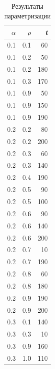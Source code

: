 \documentclass[a4paper,12pt]{article}
\begin{document}
\begin{table} [h!]
\begin{center}
\caption{Результаты параметризации}
\begin{tabular}{|r|r|r|}
\hline
    $\alpha$ &       $\rho$ & \textit{t} \\
\hline
       0.1 &        0.1 &         60 \\
\hline
       0.1 &        0.2 &         50 \\
\hline
       0.1 &        0.2 &        180 \\
\hline
       0.1 &        0.3 &        170 \\
\hline
       0.1 &        0.9 &         50 \\
\hline
       0.1 &        0.9 &        150 \\
\hline
       0.1 &        0.9 &        190 \\
\hline
       0.2 &        0.2 &         80 \\
\hline
       0.2 &        0.2 &        200 \\
\hline
       0.2 &        0.3 &         60 \\
\hline
       0.2 &        0.3 &        140 \\
\hline
       0.2 &        0.4 &        190 \\
\hline
       0.2 &        0.5 &         90 \\
\hline
       0.2 &        0.5 &        100 \\
\hline
       0.2 &        0.6 &         90 \\
\hline
       0.2 &        0.6 &        140 \\
\hline
       0.2 &        0.6 &        200 \\
\hline
       0.2 &        0.7 &         10 \\
\hline
       0.2 &        0.7 &        190 \\
\hline
       0.2 &        0.8 &         60 \\
\hline
       0.2 &        0.8 &        180 \\
\hline
       0.2 &        0.9 &        190 \\
\hline
       0.2 &        0.9 &        200 \\
\hline
       0.3 &        0.1 &        140 \\
\hline
       0.3 &        0.3 &         10 \\
\hline
       0.3 &        0.9 &        160 \\
\hline
       0.3 &        1.0 &        110 \\

\end{tabular}
\end{center}
\end{table}
\end{document}
